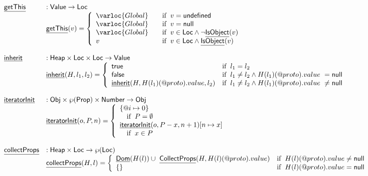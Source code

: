 \[
\begin{array}{ll}
\chf{getThis} & : \SF{Value} \rightarrow \SF{Loc} \\
& \chf{getThis}(v)
  = 
  \left\{
    \begin{array}{l@{\quad\quad}l}
      \varloc{Global} & \ifc{v=\SF{undefined}} \\
      \varloc{Global} & \ifc{v=\SF{null}} \\
      \varloc{Global} & \ifc{v\in\SF{Loc} \land \lnot\chf{IsObject}(v)} \\
      v               & \ifc{v\in\SF{Loc} \land \chf{IsObject}(v)}\\
    \end{array}
  \right.\\
\\
\chf{inherit} & : \SF{Heap} \times \SF{Loc} \times \SF{Loc} \rightarrow \SF{Value} \\
& \chf{inherit}(H,l_1,l_2) = \left\{
  \begin{array}{ll}
    \vtrue & \ifc{l_1 = l_2} \\
    \vfalse & \ifc{l_1 \neq l_2 \land H(l_1)(\varprop{proto}).value\ = \SF{null}} \\
    \chf{inherit}(H,H(l_1)(\varprop{proto}).value,l_2) & \ifc{l_1 \neq l_2 \land H(l_1)(\varprop{proto}).value\ \neq \SF{null}} \\
  \end{array}
  \right.\\
\\
\chf{iteratorInit} & : \SF{Obj} \times \powerset{\SF{Prop}} \times \SF{Number} \rightarrow \SF{Obj} \\
& \chf{iteratorInit}(o,P,n) = 
  \left\{
  \begin{array}{l}
    \{\varprop{i}\mapsto 0\} \\\quad\ifc{P = \emptyset} \\
    \chf{iteratorInit}(o,P-x,n+1)[n\mapsto x] \\\quad \ifc{x\in P} \\
  \end{array}
  \right.\\
\\
\chf{collectProps} & : \SF{Heap} \times \SF{Loc} \rightarrow \powerset{\SF{Loc}} \\
& \chf{collectProps}(H,l) = 
  \left\{
  \begin{array}{ll}
    \chf{Dom}(H(l)) \cup\ \chf{CollectProps}(H,H(l)(\varprop{proto}).value)
    & \ifc{H(l)(\varprop{proto}).value \neq \SF{null}} \\
    \{\} & \ifc{H(l)(\varprop{proto}).value = \SF{null}} \\
  \end{array}
  \right.\\
\\
\end{array}
\]
